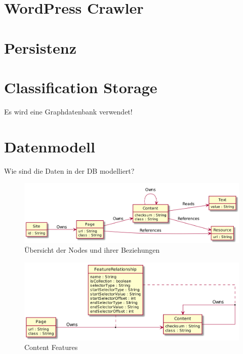     \section{WordPress Crawler}

    \section{Persistenz}
        \section{Classification Storage}
            Es wird eine Graphdatenbank verwendet!
        
        \section{Datenmodell}
            Wie sind die Daten in der DB modelliert?
        
            \begin{figure}
                \centering
                \includegraphics[width=\textwidth]{../resources/db-data-model/nodes.png}
                \caption{Übersicht der Nodes und ihrer Beziehungen}
                \label{image:dbDataModelOverview}
            \end{figure}

            \begin{figure}
                \centering
                \includegraphics[width=\textwidth]{../resources/db-data-model/content-relationship.png}
                \caption{Content Features}
                \label{image:dbDataModelContentRelationship}
            \end{figure}

